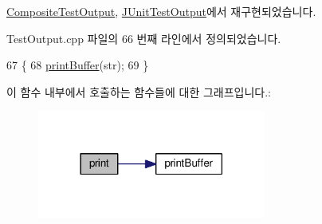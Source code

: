 \hyperlink{class_composite_test_output_a321b5c489a90374cb61c34fe5d2253ef}{Composite\+Test\+Output}, \hyperlink{class_j_unit_test_output_a7d4ba34686dd9d50f4fd01c0b80d4fa7}{J\+Unit\+Test\+Output}에서 재구현되었습니다.



Test\+Output.\+cpp 파일의 66 번째 라인에서 정의되었습니다.


\begin{DoxyCode}
67 \{
68     \hyperlink{class_test_output_a83ee46e0da3bb079280fc397b48026d8}{printBuffer}(str);
69 \}
\end{DoxyCode}


이 함수 내부에서 호출하는 함수들에 대한 그래프입니다.\+:
\nopagebreak
\begin{figure}[H]
\begin{center}
\leavevmode
\includegraphics[width=213pt]{class_test_output_a321b5c489a90374cb61c34fe5d2253ef_cgraph}
\end{center}
\end{figure}




